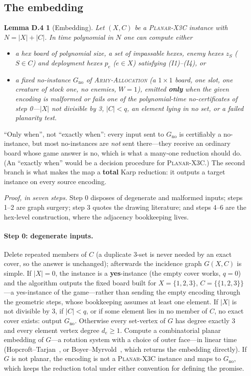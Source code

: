 \documentclass[11pt,a4paper]{article}
\theoremstyle{plain}
\newtheorem*{lemembed}{Lemma D.4}
\theoremstyle{definition}
\theoremstyle{plain}
\theoremstyle{definition}
\theoremstyle{remark}
\newcommand{\ALLOC}{\textsc{Army-Allocation}}
\newcommand{\PX}{\textsc{Planar-X3C}}
\begin{document}
\subsection{The embedding}

\begin{lemembed}[Embedding]
Let $(X,C)$ be a \PX{} instance with $N=|X|+|C|$. In time polynomial in $N$ one can compute
either
\begin{itemize}
\item a hex board of polynomial size, a set of impassable hexes, enemy hexes $z_S$ ($S\in C$) and
  deployment hexes $p_e$ ($e\in X$) satisfying (I1)--(I4), or
\item a fixed no-instance $G_{\mathrm{no}}$ of \ALLOC{} (a $1\times 1$ board, one slot, one
  creature of stock one, no enemies, $W=1$), emitted \textbf{only} when the given encoding is
  malformed or fails one of the polynomial-time no-certificates of step 0---$|X|$ not divisible
  by 3, $|C|<q$, an element lying in no set, or a failed planarity test.
\end{itemize}
\end{lemembed}

\noindent ``Only when'', not ``exactly when'': every input sent to $G_{\mathrm{no}}$ is
certifiably a no-instance, but most no-instances are \emph{not} sent there---they receive an
ordinary board whose game answer is no, which is what a many-one reduction should do. (An
``exactly when'' would be a decision procedure for \PX.) The second branch is what makes the map
a \textbf{total} Karp reduction: it outputs a target instance on every source encoding.

\smallskip
\noindent\emph{Proof, in seven steps.} Step 0 disposes of degenerate and malformed inputs;
steps 1--2 are graph surgery; step 3 quotes the drawing literature; and steps 4--6 are the
hex-level construction, where the adjacency bookkeeping lives.

\paragraph{Step 0: degenerate inputs.} Delete repeated members of $C$ (a duplicate 3-set is never
needed by an exact cover, so the answer is unchanged); afterwards the incidence graph $G(X,C)$ is
simple. If $|X|=0$, the instance is a \textbf{yes}-instance (the empty cover works, $q=0$) and
the algorithm outputs the fixed board built for $X=\{1,2,3\}$, $C=\{\{1,2,3\}\}$---a yes-instance
of the game---rather than sending the empty encoding through the geometric steps, whose
bookkeeping assumes at least one element.
If $|X|$ is not divisible by 3, if $|C|<q$, or if some element lies in no member of $C$,
no exact cover exists: output $G_{\mathrm{no}}$. Otherwise every set-vertex of $G$ has degree
exactly 3 and every element vertex degree $d_e\ge 1$. Compute a combinatorial planar embedding of
$G$---a rotation system with a choice of outer face---in linear time (Hopcroft--Tarjan~\cite{HT74}, or
Boyer--Myrvold~\cite{BM04}, which returns the embedding directly). If $G$ is not planar, the encoding is not
a \PX{} instance and maps to $G_{\mathrm{no}}$, which keeps the reduction total under either
convention for defining the promise.
\end{document}
